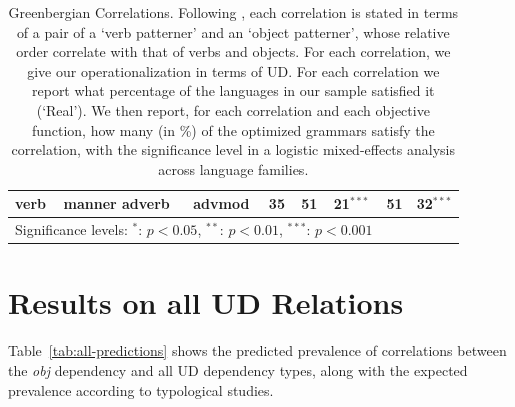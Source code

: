 \documentclass[12pt]{article}
\begin{document}
\begin{table}
\begin{center}
\begin{tabular}{|ll|l|l|l|ll|l|}
verb    &    manner adverb    &    advmod    &    35    &    51    &    \textbf{21}$^{***}$    &    51    &    \textbf{32}$^{***}$   \\
 \hline
    \multicolumn{6}{l}{\footnotesize{Significance levels: $^*$: $p < 0.05$, $^{**}$: $p < 0.01$, $^{***}$: $p < 0.001$}}
\end{tabular}
	\end{center}
	\caption{Greenbergian Correlations. Following \cite{dryer1992greenbergian}, each correlation is stated in terms of a pair of a `verb patterner' and an `object patterner', whose relative order correlate with that of verbs and objects.
	For each correlation, we give our operationalization in terms of UD. %
	For each correlation we report what percentage of the languages in our sample satisfied it (`Real').
	We then report, for each correlation and each objective function, how many (in \%) of the optimized grammars satisfy the correlation, with the significance level in a logistic mixed-effects analysis across language families.}\label{table:results-dryer}
\end{table}




\section{Results on all UD Relations}
Table~\ref{tab:all-predictions} shows the predicted prevalence of correlations between the \emph{obj} dependency and all UD dependency types, along with the expected prevalence according to typological studies.
\end{document}
